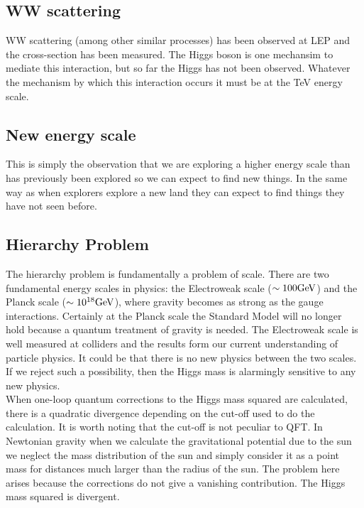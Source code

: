 \subsection{WW scattering}

WW scattering (among other similar processes) has been observed at LEP and the
cross-section has been measured. The Higgs boson is one mechansim to mediate this interaction, but so far
the Higgs has not been observed. Whatever the mechanism by which this
interaction occurs it must be at the TeV energy scale. \\

\subsection{New energy scale}

This is simply the observation that we are exploring a higher energy scale than
has previously been explored so we can expect to find new things. In the same
way as when explorers explore a new land they can expect to find things they
have not seen before.

\subsection{Hierarchy Problem}

The hierarchy problem is fundamentally a problem of scale. There are two
fundamental energy scales in physics: the Electroweak scale ($\sim100\mbox{GeV}$) and
the Planck scale ($\sim10^{18}\mbox{GeV}$), where gravity becomes as strong as the 
gauge interactions. Certainly at the Planck scale the Standard Model will no
longer hold because a quantum treatment of gravity is needed. The Electroweak 
scale is well measured at colliders and the results form our current 
understanding of particle physics. It could be that there is no new physics 
between the two scales. If we reject such a possibility, then the Higgs mass is
alarmingly sensitive to any new physics. \\

When one-loop quantum corrections to the Higgs mass squared are calculated, 
there is a quadratic divergence depending on the cut-off used to do the
calculation. It is worth noting that the cut-off is not peculiar to QFT. In
Newtonian gravity when we calculate the gravitational potential due to the sun
we neglect the mass distribution of the sun and simply consider it as a point
mass for distances much larger than the radius of the sun. The problem here
arises because the corrections do not give a vanishing contribution. The Higgs
mass squared is divergent. \\


